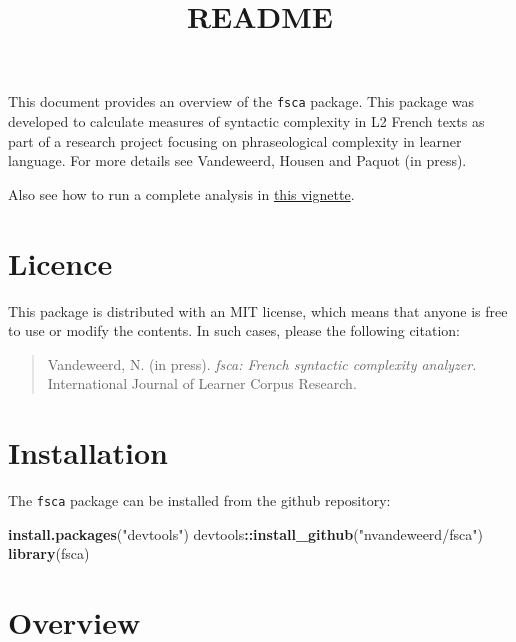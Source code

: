\documentclass[
]{article}
\title{README}
\author{}
\date{\vspace{-2.5em}}
\newenvironment{Shaded}{\begin{snugshade}}{\end{snugshade}}
\newcommand{\KeywordTok}[1]{\textcolor[rgb]{0.13,0.29,0.53}{\textbf{#1}}}
\newcommand{\NormalTok}[1]{#1}
\newcommand{\OperatorTok}[1]{\textcolor[rgb]{0.81,0.36,0.00}{\textbf{#1}}}
\newcommand{\StringTok}[1]{\textcolor[rgb]{0.31,0.60,0.02}{#1}}
\begin{document}
\maketitle

This document provides an overview of the \texttt{fsca} package. This
package was developed to calculate measures of syntactic complexity in
L2 French texts as part of a research project focusing on phraseological
complexity in learner language. For more details see Vandeweerd, Housen
and Paquot (in press).

Also see how to run a complete analysis in
\href{https://github.com/nvandeweerd/fsca/blob/main/inst/doc/example-analysis.md}{this
vignette}.

\hypertarget{licence}{%
\section{Licence}\label{licence}}

This package is distributed with an MIT license, which means that anyone
is free to use or modify the contents. In such cases, please the
following citation:

\begin{quote}
Vandeweerd, N. (in press). \emph{fsca: French syntactic complexity
analyzer.} International Journal of Learner Corpus Research.
\end{quote}

\hypertarget{installation}{%
\section{Installation}\label{installation}}

The \texttt{fsca} package can be installed from the github repository:

\begin{Shaded}
\begin{Highlighting}[]
\KeywordTok{install.packages}\NormalTok{(}\StringTok{"devtools"}\NormalTok{)}
\NormalTok{devtools}\OperatorTok{::}\KeywordTok{install_github}\NormalTok{(}\StringTok{"nvandeweerd/fsca"}\NormalTok{)}
\KeywordTok{library}\NormalTok{(fsca)}
\end{Highlighting}
\end{Shaded}

\hypertarget{overview}{%
\section{Overview}\label{overview}}
\end{document}

